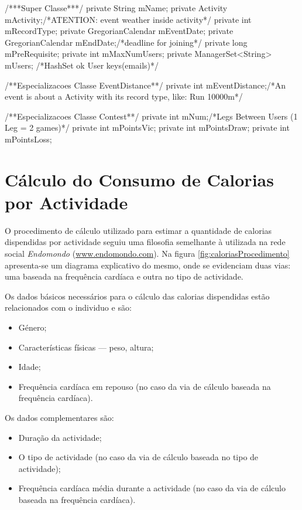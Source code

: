 \documentclass[a4paper,10pt]{report}
\begin{document}
\begin{code}[caption=Variáveis de instância da superclasse Event e subclasses respectivas (src/model/event)., label=code:event]
/***Super Classe***/
private String mName;
private Activity mActivity;/*ATENTION: event weather inside activity*/
private int mRecordType;
private GregorianCalendar mEventDate;
private GregorianCalendar mEndDate;/*deadline for joining*/
private long mPreRequisite;
private int mMaxNumUsers;
private ManagerSet<String> mUsers; /*HashSet ok User keys(emails)*/

/**Especializacoes Classe EventDistance**/
private int mEventDistance;/*An event is about a Activity with its record type, like: Run 10000m*/

/**Especializacoes Classe Contest**/
private int mNum;/*Legs Between Users (1 Leg = 2 games)*/
private int mPointsVic;
private int mPointsDraw;
private int mPointsLoss;
\end{code}

\chapter{Cálculo do Consumo de Calorias por Actividade}
\label{cap:calorias}
O procedimento de cálculo utilizado para estimar a quantidade de calorias dispendidas por actividade seguiu uma filosofia semelhante à utilizada 
na rede social \emph{Endomondo} (\url{www.endomondo.com}). 
Na figura \ref{fig:caloriasProcedimento} apresenta-se um diagrama explicativo do mesmo, onde se evidenciam duas vias: uma baseada na frequência 
cardíaca e outra no tipo de actividade.

Os dados básicos necessários para o cálculo das calorias dispendidas estão relacionados com o individuo e são:
\begin{itemize}
 \item Género;
 \item Características físicas --- peso, altura;
 \item Idade;
 \item Frequência cardíaca em repouso (no caso da via de cálculo baseada na frequência cardíaca).
\end{itemize}

Os dados complementares são:
\begin{itemize}
 \item Duração da actividade;
 \item O tipo de actividade (no caso da via de cálculo baseada no tipo de actividade);
 \item Frequência cardíaca média durante a actividade (no caso da via de cálculo baseada na frequência cardíaca).
\end{itemize}
\end{document}
